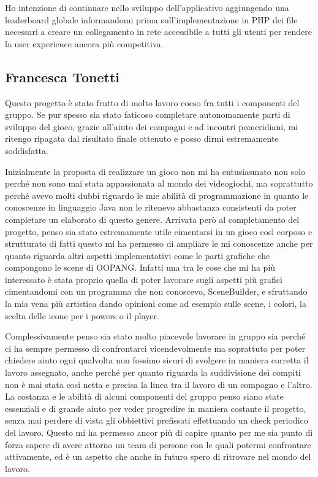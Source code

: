 \documentclass[a4paper,12pt]{report}
\begin{document}
Ho intenzione di continuare nello sviluppo dell'applicativo aggiungendo una leaderboard globale informandomi prima sull'implementazione in PHP dei file necessari a creare un collegamento in rete accessibile a tutti gli utenti per rendere la user experience ancora più competitiva.

\subsection*{Francesca Tonetti}
Questo progetto è stato frutto di molto lavoro coeso fra tutti i componenti del gruppo.
Se pur spesso sia stato faticoso completare autonomamente parti di sviluppo del gioco, grazie all'aiuto dei compagni e ad incontri pomeridiani, mi ritengo ripagata dal risultato finale ottenuto e posso dirmi estremamente soddisfatta.

Inizialmente la proposta di realizzare un gioco non mi ha entusiasmato non solo perché non sono mai stata appassionata al mondo dei videogiochi, ma soprattutto perché avevo molti dubbi riguardo le mie abilità di programmazione in quanto le conoscenze in linguaggio Java non le ritenevo abbastanza consistenti da poter completare un elaborato di questo genere.
Arrivata però al completamento del progetto, penso sia stato estremamente utile cimentarsi in un gioco così corposo e strutturato di fatti questo mi ha permesso di ampliare le mi conoscenze anche per quanto riguarda altri aspetti implementativi come le parti grafiche che compongono le scene di OOPANG.
Infatti una tra le cose che mi ha più interessato è stata proprio quella di poter lavorare sugli aspetti più grafici cimentandomi con un programma che non conoscevo, SceneBuilder, e sfruttando la mia vena più artistica dando opinioni come ad esempio sulle scene, i colori, la scelta delle icone per i powers o il player.

Complessivamente penso sia stato molto piacevole lavorare in gruppo sia perché ci ha sempre permesso di confrontarci vicendevolmente ma soprattuto per poter chiedere aiuto ogni qualvolta non fossimo sicuri di svolgere in maniera corretta il lavoro assegnato, anche perché per quanto riguarda la suddivisione dei compiti non è mai stata cosi netta e precisa la linea tra il lavoro di un compagno e l'altro.
La costanza e le abilità di alcuni componenti del gruppo penso siano state essenziali e di grande aiuto per veder progredire in maniera costante il progetto, senza mai perdere di vista gli obbiettivi prefissati effettuando un check periodico del lavoro.
Questo mi ha permesso ancor più di capire quanto per me sia punto di forza sapere di avere attorno un team di persone con le quali potermi confrontare attivamente, ed è un aspetto che anche in futuro spero di ritrovare nel mondo del lavoro.
\end{document}
